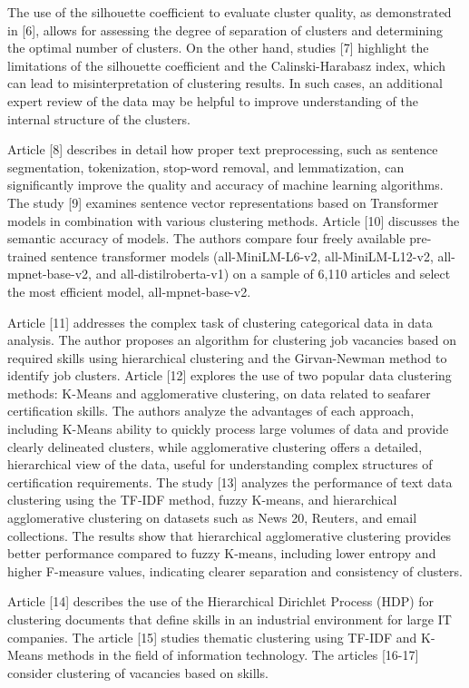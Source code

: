 The use of the silhouette coefficient to evaluate cluster quality, as
demonstrated in {[}6{]}, allows for assessing the degree of separation
of clusters and determining the optimal number of clusters. On the other
hand, studies {[}7{]} highlight the limitations of the silhouette
coefficient and the Calinski-Harabasz index, which can lead to
misinterpretation of clustering results. In such cases, an additional
expert review of the data may be helpful to improve understanding of the
internal structure of the clusters.

Article {[}8{]} describes in detail how proper text preprocessing, such
as sentence segmentation, tokenization, stop-word removal, and
lemmatization, can significantly improve the quality and accuracy of
machine learning algorithms. The study {[}9{]} examines sentence vector
representations based on Transformer models in combination with various
clustering methods. Article {[}10{]} discusses the semantic accuracy of
models. The authors compare four freely available pre-trained sentence
transformer models (all-MiniLM-L6-v2, all-MiniLM-L12-v2,
all-mpnet-base-v2, and all-distilroberta-v1) on a sample of 6,110
articles and select the most efficient model, all-mpnet-base-v2.

Article {[}11{]} addresses the complex task of clustering categorical
data in data analysis. The author proposes an algorithm for clustering
job vacancies based on required skills using hierarchical clustering and
the Girvan-Newman method to identify job clusters. Article {[}12{]}
explores the use of two popular data clustering methods: K-Means and
agglomerative clustering, on data related to seafarer certification
skills. The authors analyze the advantages of each approach, including
K-Means ability to quickly process large volumes of data and provide
clearly delineated clusters, while agglomerative clustering offers a
detailed, hierarchical view of the data, useful for understanding
complex structures of certification requirements. The study {[}13{]}
analyzes the performance of text data clustering using the TF-IDF
method, fuzzy K-means, and hierarchical agglomerative clustering on
datasets such as News 20, Reuters, and email collections. The results
show that hierarchical agglomerative clustering provides better
performance compared to fuzzy K-means, including lower entropy and
higher F-measure values, indicating clearer separation and consistency
of clusters.

Article {[}14{]} describes the use of the Hierarchical Dirichlet Process
(HDP) for clustering documents that define skills in an industrial
environment for large IT companies. The article {[}15{]} studies
thematic clustering using TF-IDF and K-Means methods in the field of
information technology. The articles {[}16-17{]} consider clustering of
vacancies based on skills.


